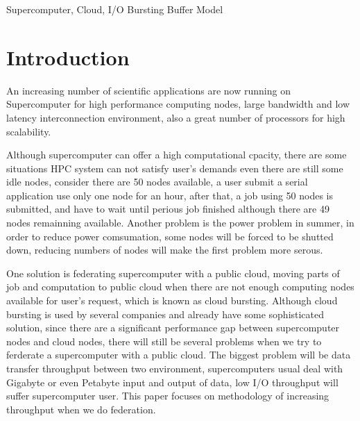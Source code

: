 \documentclass[JIP,draft]{ipsj}
\begin{document}
\begin{keyword}
Supercomputer, Cloud, I/O Bursting Buffer Model
\end{keyword}

\maketitle

\section{Introduction}
An increasing number of scientific applications are now running on Supercomputer for high performance computing nodes, large bandwidth and low latency interconnection environment, also a great number of processors for high scalability.

Although supercomputer can offer a high computational cpacity, there are some situations HPC system can not satisfy user's demands even there are still some idle nodes, consider there are 50 nodes available, a user submit a serial application use only one node for an hour, after that, a job using 50 nodes is submitted, and have to wait until perious job finished although there are 49 nodes remainning available.
Another problem is the power problem in summer, in order to reduce power comsumation, some nodes will be forced to be shutted down, reducing numbers of nodes will make the first problem more serous.

One solution is federating supercomputer with a public cloud, moving parts of job and computation to public cloud when there are not enough computing nodes available for user's request, which is known as cloud bursting.
Although cloud bursting is used by several companies and already have some sophisticated solution, since there are a significant performance gap between supercomputer nodes and cloud nodes, there will still be several problems when we try to ferderate a supercomputer with a public cloud.
The biggest problem will be data transfer throughput between two environment, supercomputers usual deal with Gigabyte or even Petabyte input and output of data, low I/O throughput will suffer supercomputer user. This paper focuses on methodology of increasing throughput when we do federation.
\end{document}
